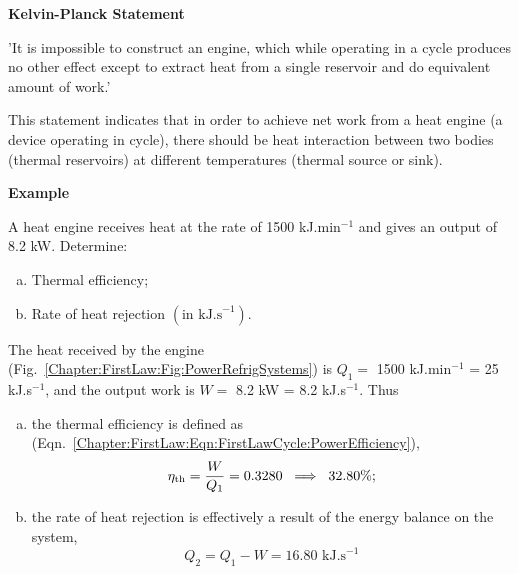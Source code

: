 \begin{shaded}
  \begin{center}
    {\bf Kelvin-Planck Statement}
  \end{center}
  'It is impossible to construct an engine, which while operating in a cycle produces no other effect except to extract heat from a single reservoir and do equivalent amount of work.'
\end{shaded}
This statement indicates that in order to achieve net work from a heat engine (\ie a device operating in cycle), there should be heat interaction between two bodies (\ie thermal reservoirs) at different temperatures (\ie thermal source or sink). 

   
   \begin{MyExample}{\begin{center}{\bf Example}\end{center}}
     \begin{example}\label{Chapter:SecondLaw:Example1}\citep{Rajput_Book}
        A heat engine receives heat at the rate of 1500 kJ.min$^{-1}$ and gives an output of 8.2 kW. Determine:
        \begin{enumerate}[a)]
          \item Thermal efficiency;
          \item Rate of heat rejection $\left(\text{in kJ.s}^{-1}\right)$.
        \end{enumerate}
     \end{example}

       The heat received by the engine (Fig.~\ref{Chapter:FirstLaw:Fig:PowerRefrigSystems}) is $Q_{1}=$ 1500 kJ.min$^{-1}$ = 25 kJ.s$^{-1}$, and the output work is $W=$ 8.2 kW = 8.2 kJ.s$^{-1}$. Thus
       \begin{enumerate}[a)]
         \item the thermal efficiency is defined as (Eqn.~\ref{Chapter:FirstLaw:Eqn:FirstLawCycle:PowerEfficiency}),
           \begin{displaymath}
             \eta_{\text{th}} = \displaystyle\frac{W}{Q_{1}} = 0.3280 \;\;\Longrightarrow\;\; 32.80\%;
           \end{displaymath}
         \item the rate of heat rejection is effectively a result of the energy balance on the system,
           \begin{displaymath}
             Q_{2}=Q_{1}-W = 16.80 \text{ kJ.s}^{-1}
           \end{displaymath}
           
       \end{enumerate}
   \end{MyExample}
   

